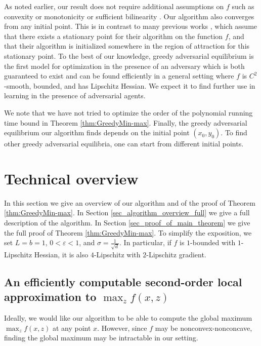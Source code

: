 \documentclass[11pt,letterpaper]{article}
\renewcommand{\epsilon}{\varepsilon}
\begin{document}
\noindent
%
%
As noted earlier, our result does not require additional assumptions on $f$ such as convexity or monotonicity \cite{thekumparampil2019efficient, rafique2018non, nouiehed2019solving} or sufficient bilinearity \cite{abernethy2019last}.
%
Our algorithm also converges from any initial point. 
%
 This is in contrast to many previous works \cite{heusel2017gans, minmax_Jordan, adolphs2018local, wang2020ridge}, which assume that there exists a stationary point for their algorithm on the function $f$, and that their algorithm is initialized somewhere in the region of attraction for this stationary point.
 To the best of our knowledge,  greedy adversarial equilibrium is the first model for optimization in the presence of an adversary which is both guaranteed to exist and can be found efficiently in a general setting where $f$ is $C^2$-smooth, bounded, and has Lipschitz Hessian. 
 We expect it to find further use in learning in the presence of adversarial agents.

%
We note that we have not tried to optimize the order of the polynomial running time bound in Theorem \ref{thm:GreedyMin-max}. 
%
%
Finally, the greedy adversarial equilibrium our algorithm finds depends on the initial point $(x_0, y_0)$.  
%
 To  find other greedy adversarial equilibria, one can start from different initial points.







\section{Technical overview} \label{ses_alg_overview}
%
In this section we give an overview of our algorithm and of the proof of Theorem \ref{thm:GreedyMin-max}. In Section \ref{sec_algorithm_overview_full} we give a full description of the algorithm. 
%
In Section \ref{sec_proof_of_main_theorem} we give the full proof of Theorem \ref{thm:GreedyMin-max}.
%
 To simplify the exposition, we set $L = b = 1$,  $0<\epsilon< 1$, and $\sigma = \frac{1}{\sqrt{d}}$.
 In particular, if $f$ is $1$-bounded with $1$-Lipschitz Hessian, it is also $4$-Lipschitz with $2$-Lipschitz gradient.
 
 \subsection{An efficiently computable second-order local approximation to $\max_{z} f(x,z)$} \label{sec_local_approx}
 Ideally, we would like our algorithm to be able to compute the global maximum $\max_{z} f(x,z)$ at any point $x$.
However, since $f$ may be nonconvex-nonconcave, finding the global maximum may be intractable in our setting.
 
\end{document}
